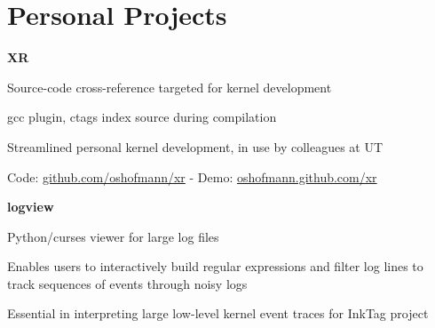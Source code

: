 
\section{Personal Projects}
\begin{outerlist}
\item[] \textbf{XR}
    \begin{innerlist}
           \item Source-code cross-reference targeted for kernel
development
           \item gcc plugin, ctags index source during compilation
           \item Streamlined personal kernel development, in use by
colleagues at UT
           \item Code:
\href{http://github.com/oshofmann/xr}{github.com/oshofmann/xr}
           - Demo: \href{http://oshofmann.github.com/xr}{oshofmann.github.com/xr}
     \end{innerlist}

\item[] \textbf{logview}
    \begin{innerlist}
           \item Python/curses viewer for large log files
           \item Enables users to interactively build regular expressions
and filter log lines to track sequences of events through noisy logs
           \item Essential in interpreting large low-level kernel event
traces for InkTag project
     \end{innerlist}
\end{outerlist}
